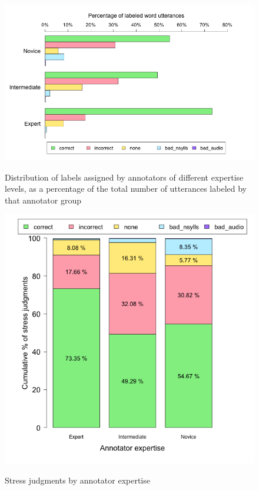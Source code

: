 			\begin{figure}[htb]
				\centering
				\caption[Distribution of labels by annotator expertise]{Distribution of labels assigned by annotators of different expertise levels,
				as a percentage of the total number of utterances labeled by that annotator group
				}
				\includegraphics[width=\textwidth]{img/plots/pctJudgmentsByExpertise-notStacked}
				\label{fig:agreement:expertisebars}
			\end{figure}			
			
			
			\begin{figure}[htb]
				\centering
				\caption{Stress judgments by annotator expertise}
				\includegraphics[width=.9\textwidth]{img/plots/pctJudgmentsByExpertise-NoTitle}
				\label{fig:agreement:expertisebars}
			\end{figure}
			
